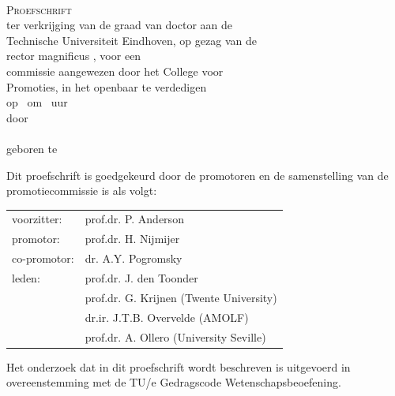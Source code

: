 \newpage
\thispagestyle{empty}



\vspace*{30mm}
\begin{center}
{\LARGE\sf\maintitle}\\[30mm] %
{\large\textsc{Proefschrift}}\\[8mm]
ter verkrijging van de graad van doctor aan de\\
Technische Universiteit Eindhoven, op gezag van de\\
rector magnificus \rector, voor een\\
commissie aangewezen door het College voor\\
Promoties, in het openbaar te verdedigen\\
op \ om \ uur\\[8mm]
door\\[8mm]
\@author\\[8mm]
geboren te \placeofbirth
\end{center}
\vfill

\newpage
\thispagestyle{empty}

\noindent
Dit proefschrift is goedgekeurd door de promotoren en de samenstelling van de promotiecommissie is als volgt:\\[7mm]

\noindent
\begin{tabular}{@{}l p{9.8cm}}
voorzitter:                 &   prof.dr. P. Anderson \\
promotor:                   &   prof.dr. H. Nijmijer \\
co-promotor:                &   dr. A.Y. Pogromsky \\
leden:                      &   prof.dr. J. den Toonder \\
                            &   prof.dr. G. Krijnen (Twente University) \\
                            &   dr.ir. J.T.B. Overvelde (AMOLF) \\
                            &   prof.dr. A. Ollero (University Seville) \\
\end{tabular}

\vfill
\noindent
Het onderzoek dat in dit proefschrift wordt beschreven is uitgevoerd in overeenstemming met de TU/e Gedragscode Wetenschapsbeoefening.
